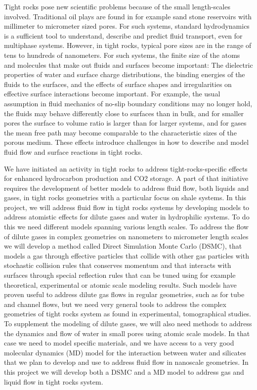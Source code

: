Tight rocks pose new scientific problems because of the small length-scales involved. Traditional oil plays are found in for example sand stone reservoirs with millimeter to micrometer sized pores. For such systems, standard hydrodynamics is a sufficient tool to understand, describe and predict fluid transport, even for multiphase systems. However, in tight rocks, typical pore sizes are in the range of tens to hundreds of nanometers. For such systems, the finite size of the atoms and molecules that make out fluids and surfaces become important: The dielectric properties of water and surface charge distributions, the binding energies of the fluids to the surfaces, and the effects of surface shapes and irregularities on effective surface interactions become important. For example, the usual assumption in fluid mechanics of no-slip boundary conditions may no longer hold, the fluids may behave differently close to surfaces than in bulk, and for smaller pores the surface to volume ratio is larger than for larger systems, and for gases the mean free path may become comparable to the characteristic sizes of the porous medium. These effects introduce challenges in how to describe and model fluid flow and surface reactions in tight rocks.

We have initiated an activity in tight rocks to address tight-rocks-specific effects for enhanced hydrocarbon production and CO2 storage. A part of that initiative requires the development of better models to address fluid flow, both liquids and gases, in tight rocks geometries with a particular focus on shale systems. In this project, we will address fluid flow in tight rocks systems by developing models to address atomistic effects for dilute gases and water in hydrophilic systems. To do this we need different models spanning various length scales. To address the flow of dilute gases in complex geometries on nanometers to micrometer length scales we will develop a method called Direct Simulation Monte Carlo (DSMC), that models a gas through effective particles that collide with other gas particles with stochastic collision rules that conserves momentum and that interacts with surfaces through special reflection rules that can be tuned using for example theoretical, experimental or atomic scale modeling results. Such models have proven useful to address dilute gas flows in regular geometries, such as for tube and channel flows, but we need very general tools to address the complex geometries of tight rocks system as found in experimental, tomographical studies. To supplement the modeling of dilute gases, we will also need methods to address the dynamics and flow of water in small pores using atomic scale models. In that case we need to model specific materials, and we have access to a very good molecular dynamics (MD) model for the interaction between water and silicates that we plan to develop and use to address fluid flow in nanoscale geometries. In this project we will develop both a DSMC and a MD model to address gas and liquid flow in tight rocks system.
